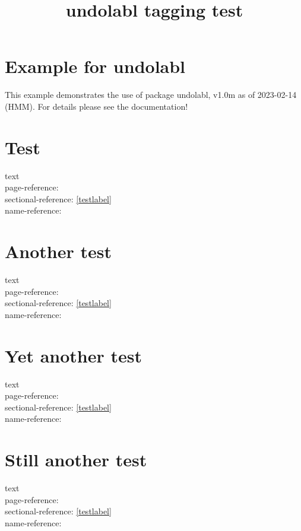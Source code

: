 \documentclass{article}
\title{undolabl tagging test}
\begin{document}
\section*{Example for undolabl}
This example demonstrates the use of package\newline
\textsf{undolabl}, v1.0m as of 2023-02-14 (HMM).\newline
For details please see the documentation!

\bigskip

\section{Test}
text \label{testlabel}\\
page-reference: \pageref{testlabel}\\%
sectional-reference: \ref{testlabel}\\%
name-reference: %

\newpage

\section{Another test}
text \\
page-reference: \pageref{testlabel}\\%
sectional-reference: \ref{testlabel}\\%
name-reference: %

\newpage

\section{Yet another test}
text \\
page-reference: \pageref{testlabel}\\%
sectional-reference: \ref{testlabel}\\%
name-reference: %

\newpage

\section{Still another test}
text \\
page-reference: \pageref{testlabel}\\%
sectional-reference: \ref{testlabel}\\%
name-reference: %
\end{document}
